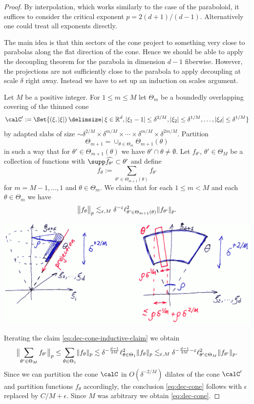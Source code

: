 \begin{proof}
By interpolation, which works similarly to the case of the paraboloid, it suffices to consider the critical exponent $p=2(d+1)/(d-1)$.
Alternatively one could treat all exponents directly.

The main idea is that thin sectors of the cone project to something very close to parabolas along the flat direction of the cone.
Hence we should be able to apply the decoupling theorem for the parabola in dimension $d-1$ fiberwise.
However, the projections are not sufficiently close to the parabola to apply decoupling at scale $\delta$ right away.
Instead we have to set up an induction on scales argument.

Let $M$ be a  positive integer.
For $1\leq m \leq M$ let $\Theta_{m}$ be a boundedly overlapping covering of the thinned cone
\[
\calC' := \Set{(\xi,\abs{\xi}) \given \xi\in\R^{d}, \abs{\xi_{1}-1} \leq \delta^{2/M}, \abs{\xi_{2}} \leq \delta^{1/M}, \dotsc, \abs{\xi_{d}} \leq \delta^{1/M}}
\]
by adapted slabs of size $\sim \delta^{2/M} \times \delta^{m/M} \times \dotsm \times \delta^{m/M} \times \delta^{2m/M}$.
Partition
\[
\Theta_{m+1} = \cup_{\theta \in \Theta_{m}} \Theta_{m+1}(\theta)
\]
in such a way that for $\theta' \in \Theta_{m+1}(\theta)$ we have $\theta' \cap \theta \neq \emptyset$.
Let $f_{\theta'}$, $\theta' \in \Theta_{M}$ be a collection of functions with $\supp \widehat{f_{\theta'}} \subset \theta'$ and define
\[
f_{\theta} := \sum_{\theta' \in \Theta_{m+1}(\theta)} f_{\theta'}
\]
for $m=M-1,\dotsc,1$ and $\theta\in\Theta_{m}$.
We claim that for each $1\leq m < M$ and each $\theta \in \Theta_{m}$ we have
\begin{equation}
\label{eq:dec-cone-inductive-claim}
\norm[\big]{ f_{\theta} }_{p}
\lesssim_{\epsilon,M} \delta^{-\epsilon}
\ell^{2}_{\theta' \in \Theta_{m+1}(\theta)} \norm{ f_{\theta'} }_{p}.
\end{equation}
\begin{center}
\includegraphics[width=\textwidth]{fig-cone.png}
\end{center}
Iterating the claim \eqref{eq:dec-cone-inductive-claim} we obtain
\[
\norm[\big]{ \sum_{\theta' \in \Theta_{M}} f_{\theta'} }_{p}
\leq
\sum_{\theta \in \Theta_{1}} \norm{f_{\theta}}_{p}
\lesssim
\delta^{-\frac{d-1}{2M}} \ell^{2}_{\theta \in \Theta_{1}} \norm{f_{\theta}}_{p}
\lesssim_{\epsilon,M} \delta^{-\frac{d-1}{2M}-\epsilon}
\ell^{2}_{\theta' \in \Theta_{M}} \norm{ f_{\theta'} }_{p}.
\]
Since we can partition the cone $\calC$ in $O(\delta^{-2/M})$ dilates of the cone $\calC'$ and partition functions $f_{\theta}$ accordingly, the conclusion \eqref{eq:dec-cone} follows with $\epsilon$ replaced by $C/M+\epsilon$.
Since $M$ was arbitrary we obtain \eqref{eq:dec-cone}.


\end{proof}
